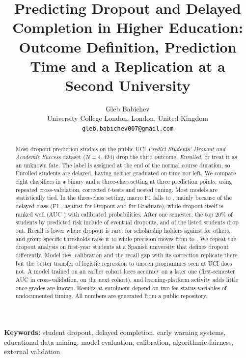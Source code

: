 \documentclass[11pt,a4paper]{article}
\title{Predicting Dropout and Delayed Completion in Higher Education:\\
\large Outcome Definition, Prediction Time and a Replication at a Second University}
\author{Gleb Babichev\\
\small University College London, London, United Kingdom\\
\small \texttt{gleb.babichev007@gmail.com}}
\date{}
\begin{document}
\maketitle

\begin{abstract}
Most dropout-prediction studies on the public UCI \emph{Predict Students' Dropout and Academic Success} dataset ($N=4{,}424$) drop the third outcome, \emph{Enrolled}, or treat it as an unknown fate. The label is assigned at the end of the normal course duration, so Enrolled students are delayed, having neither graduated on time nor left. We compare eight classifiers in a binary and a three-class setting at three prediction points, using repeated cross-validation, corrected $t$-tests and nested tuning. Most models are statistically tied. In the three-class setting, macro F1 falls to \bestmulticlassF{}, mainly because of the delayed class (F1 \multiclassXGBoostfenrolled{}, against \multiclassXGBoostfdropout{} for Dropout and \multiclassXGBoostfgraduate{} for Graduate), while dropout itself is ranked well (AUC \multiclassXGBoostaucdropout) with calibrated probabilities. After one semester, the top 20\% of students by predicted risk include \alertSemoneRPctTwenty{} of eventual dropouts, and \alertSemonePPctTwenty{} of the listed students drop out. Recall is lower where dropout is rare: \thrScholarshipYesSingleRecall{} for scholarship holders against \thrScholarshipNoSingleRecall{} for others, and group-specific thresholds raise it to \thrScholarshipYesGroupRecall{} while precision moves from \thrScholarshipAllSinglePrecision{} to \thrScholarshipAllGroupPrecision. We repeat the dropout analysis on \upvN{} first-year students at a Spanish university that defines dropout differently. Model ties, calibration and the recall gap with its correction replicate there, but the better transfer of logistic regression to unseen programmes seen at UCI does not. A model trained on an earlier cohort loses accuracy on a later one (first-semester AUC \upvSemoneXgbAuc{} in cross-validation, \upvTaSemoneXgbAuc{} on the next cohort), and learning-platform activity adds little once grades are known. Results at enrolment depend on two fee-status variables of undocumented timing. All numbers are generated from a public repository.
\end{abstract}

\noindent\textbf{Keywords:} student dropout, delayed completion, early warning systems, educational data mining, model evaluation, calibration, algorithmic fairness, external validation
\end{document}
